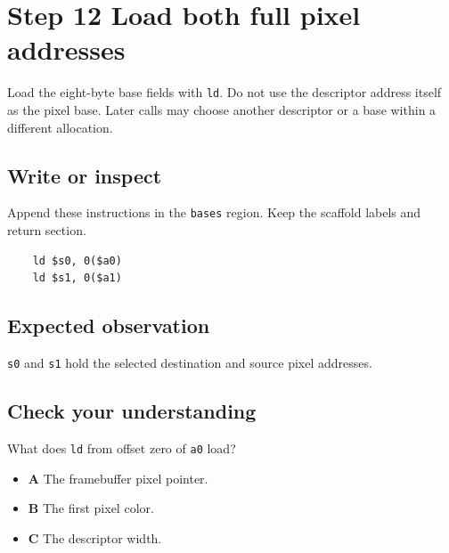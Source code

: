 \section{Step 12 Load both full pixel addresses}\label{blit-s12}

Load the eight-byte base fields with \texttt{ld}. Do not use the descriptor address itself as the pixel base. Later calls may choose another descriptor or a base within a different allocation.

\subsection{Write or inspect}
Append these instructions in the \texttt{bases} region. Keep the scaffold labels and return section.

\begin{verbatim}
    ld $s0, 0($a0)
    ld $s1, 0($a1)
\end{verbatim}

\subsection{Expected observation}
\texttt{s0} and \texttt{s1} hold the selected destination and source pixel addresses.

\subsection{Check your understanding}
What does \texttt{ld} from offset zero of \texttt{a0} load?

\begin{itemize}
  \item \textbf{A} The framebuffer pixel pointer.
  \item \textbf{B} The first pixel color.
  \item \textbf{C} The descriptor width.
\end{itemize}
